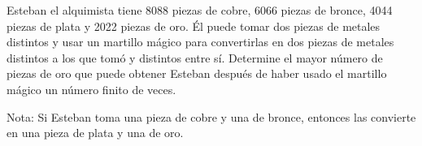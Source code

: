 Esteban el alquimista tiene 8088 piezas de cobre, 6066 piezas de bronce, 4044 piezas de plata y 2022 piezas de oro. Él puede tomar dos piezas de metales distintos y usar un martillo mágico para convertirlas en dos piezas de metales distintos a los que tomó y distintos entre sí. Determine el mayor número de piezas de oro que puede obtener Esteban después de haber usado el martillo mágico un número finito de veces. \newline 

Nota: Si Esteban toma una pieza de cobre y una de bronce, entonces las convierte en una pieza de plata y una de oro.